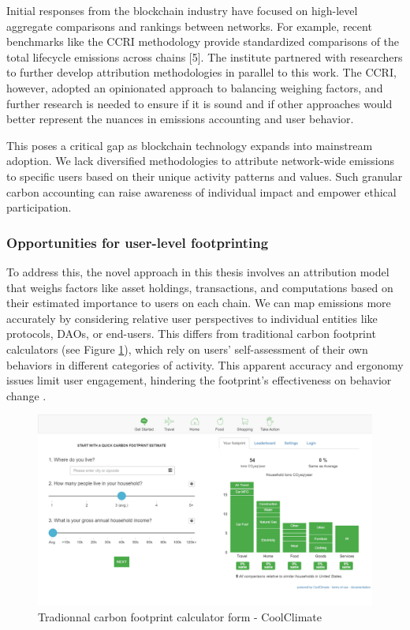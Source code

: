 \documentclass[11pt]{report}
\begin{document}
Initial responses from the blockchain industry have focused on high-level aggregate comparisons and rankings between networks. For example, recent benchmarks like the \ac{CCRI} methodology provide standardized comparisons of the total lifecycle emissions across chains [5]. The institute partnered with researchers to further develop attribution methodologies in parallel to this work. The CCRI, however, adopted an opinionated approach to balancing weighing factors, and further research is needed to ensure if it is sound and if other approaches would better represent the nuances in emissions accounting and user behavior.

This poses a critical gap as blockchain technology expands into mainstream adoption. We lack diversified methodologies to attribute network-wide emissions to specific users based on their unique activity patterns and values. Such granular carbon accounting can raise awareness of individual impact and empower ethical participation.

\subsubsection*{Opportunities for user-level footprinting}

To address this, the novel approach in this thesis involves an attribution model that weighs factors like asset holdings, transactions, and computations based on their estimated importance to users on each chain. We can map emissions more accurately by considering relative user perspectives to individual entities like protocols, DAOs, or end-users. This differs from traditional carbon footprint calculators (see Figure \ref{fig:carbon_footprint_calculator}), which rely on users' self-assessment of their own behaviors in different categories of activity. This apparent accuracy and ergonomy issues limit user engagement, hindering the footprint's effectiveness on behavior change \cite{saloOpportunitiesLimitationsCarbon2019,mulrowStateCarbonFootprint2019}.


\begin{figure}[hbt!]
    \centering
    \centerline{\includegraphics[scale=0.25]{figures/carbon_footprint_calculator.png}}
    \caption[YO]{Tradionnal carbon footprint calculator form - CoolClimate\footnotemark}
    \label{fig:carbon_footprint_calculator}
\end{figure}
\end{document}
